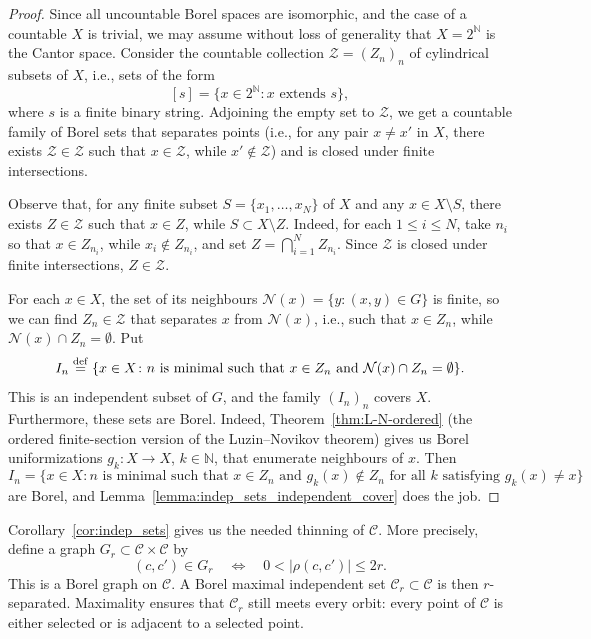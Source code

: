 \documentclass[11pt]{paper}
\newcommand{\bN}{\mathbb N}
\newcommand{\cZ}{\mathcal Z}
\newcommand{\cC}{\mathcal C}
\begin{document}
\begin{proof}
  Since all uncountable Borel spaces are isomorphic, and the case of a countable \(X\) is trivial,
  we may assume without loss of generality that \(X = 2^{\bN}\) is the Cantor space.  Consider the
  countable collection $\mathscr Z = (Z_n)_n$ of cylindrical subsets of \(X\), i.e., sets of the
  form
  \[[s] = \{x \in 2^{\bN}\colon  x \text{ extends } s\},\]
  where \(s\) is a finite binary string.  Adjoining the empty set to \(\mathscr Z\), we get a
  countable family of Borel sets that separates points (i.e., for any pair $x\ne x'$ in $X$, there
  exists $\cZ\in\mathscr Z$ such that $x\in \cZ$, while $x'\notin \cZ$) and is closed under finite
  intersections.

  Observe that, for any finite subset $S=\{x_1, \ldots , x_N\}$ of $X$ and any $x\in X\setminus S$,
  there exists $Z\in \mathscr Z$ such that $x\in Z$, while $S\subset X\setminus Z$.  Indeed, for
  each $1\le i \le N$, take $n_i$ so that $x\in Z_{n_i}$, while $x_i\notin Z_{n_i}$, and set
  $Z = \bigcap_{i=1}^N Z_{n_i}$. Since $\mathscr Z$ is closed under finite intersections,
  $Z\in\mathscr Z$.

  For each $x\in X$, the set of its neighbours $\mathcal N(x)=\{y\colon (x, y)\in G\}$ is finite, so we can
  find $Z_n\in\mathscr Z$ that separates $x$ from $\mathcal N(x)$, i.e., such that $x\in Z_n$, while
  $\mathcal N(x)\cap Z_n = \emptyset$. Put
  \[
  I_{n} \stackrel{\rm def}= \{x \in X\colon
n \text{ is minimal such that } x \in Z_{n} \text{ and } \mathcal N(x)\cap Z_n = \emptyset\}.
  \]
  This is an independent subset of $G$, and the family \((I_{n})_{n}\) covers \(X\).  Furthermore,
  these sets are Borel.  Indeed, Theorem~\ref{thm:L-N-ordered} (the ordered finite-section version of
the Luzin--Novikov theorem) gives us Borel uniformizations
  \(g_{k}\colon  X \to X\), \(k \in \bN\), that enumerate neighbours of \(x\). Then
  \[  I_{n} = \{x \in X\colon n \text{ is minimal such that } x \in Z_{n} \text{ and }
    g_{k}(x) \not \in Z_{n} \text{ for all }k \text{ satisfying } g_{k}(x) \ne x\}\]
are Borel, and
Lemma~\ref{lemma:indep_sets_independent_cover} does the job.
\end{proof}

Corollary~\ref{cor:indep_sets} gives us the needed thinning of $\cC$.  More precisely, define a
graph $G_r \subset \cC\times \cC$ by
\[
(c, c')\in G_r \quad \Longleftrightarrow  \quad 0 < | \rho(c,c') | \le 2r.
\]
This is a Borel graph on $\cC$. A Borel maximal independent set $\cC_r\subset \cC$ is then
$r$-separated. Maximality ensures that $\cC_r$ still meets every orbit: every point
of $\cC$ is either selected or is adjacent to a selected point.
\end{document}
